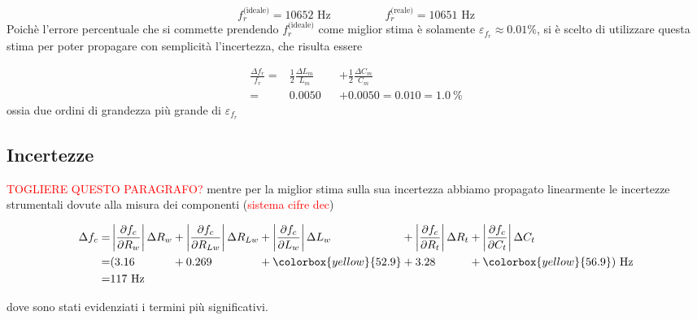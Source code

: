 \documentclass[12pt,italian]{article}
\newcommand{\err}[1]{\textcolor{red}{#1}}
\begin{document}
\begin{equation*}
	f_{r}^{\text{(ideale)}} = 10652 \text{ Hz} \hspace{2cm} f_{r}^{\text{(reale)}} = 10651 \text{ Hz}
\end{equation*}
Poichè l'errore percentuale che si commette prendendo $f_{r}^{\text{(ideale)}}$
come miglior stima è solamente $\varepsilon_{f_r} \approx 0.01\%$, si è scelto
di utilizzare questa stima per poter propagare con semplicità l'incertezza, che
risulta essere

\begin{equation*}
	\begin{alignedat}{2}
		\frac{\Delta f_{r}}{f_{r}} = & \frac{1}{2} \frac{\Delta L_{m}}{L_{m}} &  & + \frac{1}{2} \frac{\Delta C_{m}}{C_{m}} \\
		=                            & 0.0050                                 &  & + 0.0050
		= 0.010 = 1.0 \ \%
	\end{alignedat}
\end{equation*}
ossia due ordini di grandezza più grande di $\varepsilon_{f_r}$

\subsection{Incertezze}

\noindent
\err{TOGLIERE QUESTO PARAGRAFO?}
mentre per la miglior stima sulla sua incertezza abbiamo propagato linearmente
le incertezze strumentali dovute alla misura dei componenti (\err{sistema cifre dec})

\begin{equation*}
	\begin{alignedat}{5}
		\Delta f_{c} = & \left|\frac{\partial f_{c}}{\partial R_{w}}\right| \Delta R_{w} &  & +  \left|\frac{\partial f_{c}}{\partial R_{Lw}}\right| \Delta R_{Lw} &  & + \left|\frac{\partial f_{c}}{\partial L_{w}}\right| \Delta L_{w} &  & + \left|\frac{\partial f_{c}}{\partial R_{t}}\right| \Delta R_{t} &  & + \left|\frac{\partial f_{c}}{\partial C_{t}}\right| \Delta C_{t} \\
		=              & ( 3.16                                                          &  & +  0.269                                                             &  & + \colorbox{yellow}{52.9}                                         &  & + 3.28                                                            &  & + \colorbox{yellow}{56.9} ) \text{ Hz}                            \\
		=              & 117 \text{ Hz}
	\end{alignedat}
\end{equation*}

\noindent
dove sono stati evidenziati i termini più significativi.
\end{document}
